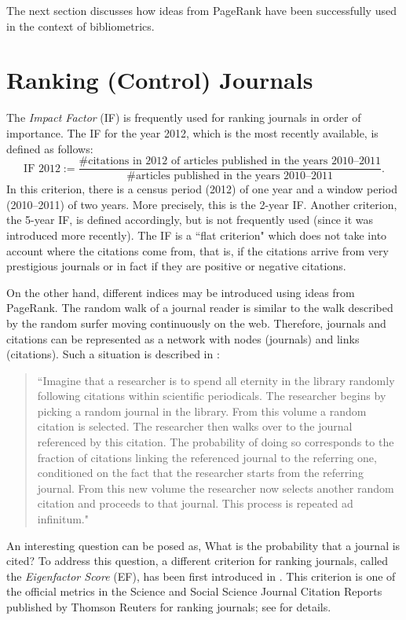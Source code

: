 \documentclass[11pt,draftcls,onecolumn]{IEEEtran}
\begin{document}
The next section discusses how ideas from PageRank have been
successfully used in the context of bibliometrics.

\section*{Ranking (Control) Journals}

The {\it Impact Factor} (IF) is frequently used
for ranking journals in order of importance.
The IF for the year 2012, which is the most recently available, is defined as follows:
$$
\mbox{IF 2012} 
   := \frac{\mbox{\# citations in 2012 of articles published in the years 2010--2011}}{\mbox{\# articles published in the years 2010--2011}}.
$$
In this criterion, there is a census period (2012) of one year and a window 
period (2010--2011) of two years.  
More precisely, this is the 2-year IF. Another criterion, the 5-year IF, 
is defined accordingly, but is not frequently used (since it was introduced more
recently).
The IF is a ``flat criterion" which does not take into account 
where the citations come from, that is, if the citations arrive 
from very prestigious journals or in fact if they are positive or negative citations.


On the other hand, different indices may be introduced using ideas from PageRank. 
The random walk of a journal reader is similar to the walk described by the 
random surfer moving continuously on the web. Therefore, 
journals and citations can be represented as a network with 
nodes (journals) and links (citations). 
Such a situation is described in \cite{WesBerBer:10}: 
\begin{quote}
``Imagine that a researcher is to spend all eternity in the library randomly 
following citations within scientific periodicals. The researcher begins by 
picking a random journal in the library. From this volume a random citation 
is selected. The researcher then walks over to the journal referenced by this 
citation. The probability of doing so corresponds to the fraction of
citations linking the referenced journal to the referring one, 
conditioned on the fact that the researcher starts from the referring
journal. From this new volume the researcher now selects another 
random citation and proceeds to that journal. 
This process is repeated ad infinitum." 
\end{quote}
An interesting question can be posed as,
What is the probability that a journal is cited? To address this question, a different criterion for ranking journals, 
called the {\it Eigenfactor Score} (EF), has been first introduced in \cite{Ber:07}. This criterion is one of the official metrics 
in the Science and Social Science Journal Citation Reports
published
by Thomson Reuters for ranking journals; see \cite{Franceschet:13} for details.
\end{document}

